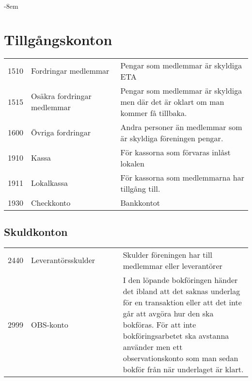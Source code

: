 
	
		\begin{adjustwidth}{}{-8em}
			\section{Tillgångskonton}
			\label{sec:kontoplan:tillgång}
			\begin{xtabular}[l]{l p{0.4\linewidth} p{0.6\linewidth}}
				1510 & Fordringar medlemmar &  Pengar som medlemmar är skyldiga ETA \\
				1515 & Osäkra fordringar medlemmar & Pengar som medlemmar är skyldiga men där det är oklart om man kommer få tillbaka. \\
				1600 & Övriga fordringar & Andra personer än medlemmar som är skyldiga föreningen pengar. \\
				1910 & Kassa & För kassorna som förvaras inlåst lokalen \\
				1911 & Lokalkassa & För kassorna som medlemmarna har tillgång till. \\
				1930 & Checkkonto & Bankkontot \\
				
			\end{xtabular}
		\end{adjustwidth}
		
		\clearpage
		\begin{adjustwidth}{-8em}{}
			\section{Skuldkonton}
			\label{sec:kontoplan:skuld}
			\tablefirsthead{Konto	&	Namn	&	Kommentar	\\\toprule}
			\begin{xtabular}[l]{l p{0.4\linewidth} p{0.6\linewidth}}
				2440 & Leverantörsskulder & Skulder föreningen har till medlemmar eller leverantörer \\
				2999 & OBS-konto & I den löpande bokföringen händer det ibland att det saknas underlag för en transaktion eller att det inte går att avgöra hur den ska bokföras. För att inte bokföringsarbetet ska avstanna använder men ett observationskonto som man sedan bokför från när underlaget är klart. \\
				
			\end{xtabular}
		\end{adjustwidth}
	
